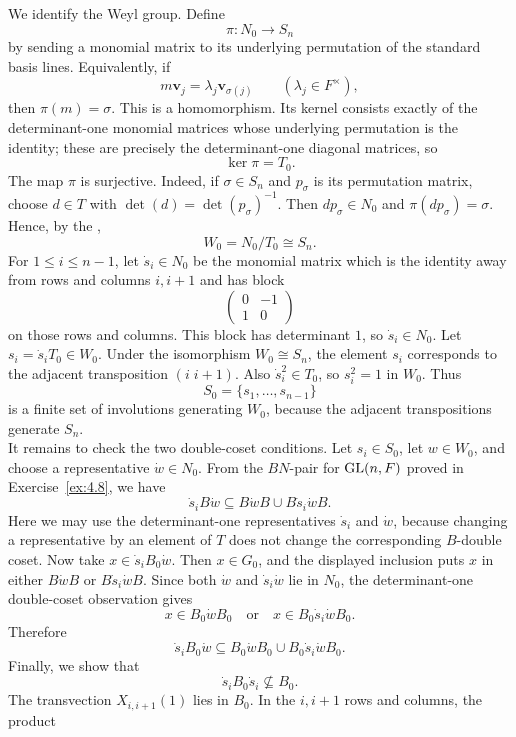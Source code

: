\documentclass[../Odyssey_Project.tex]{subfiles}
\begin{document}
\begin{solution}
We identify the Weyl group. Define
\[
    \pi\colon N_0\to S_n
\]
by sending a monomial matrix to its underlying permutation of the standard basis lines. Equivalently, if
\[
    m\mathbf v_j=\lambda_j\mathbf v_{\sigma(j)}
    \qquad(\lambda_j\in F^\times),
\]
then $\pi(m)=\sigma$. This is a homomorphism. Its kernel consists exactly of the determinant-one monomial matrices whose underlying permutation is the identity; these are precisely the determinant-one diagonal matrices, so
\[
    \ker\pi=T_0.
\]
The map $\pi$ is surjective. Indeed, if $\sigma\in S_n$ and $p_\sigma$ is its permutation matrix, choose $d\in T$ with $\det(d)=\det(p_\sigma)^{-1}$. Then $dp_\sigma\in N_0$ and $\pi(dp_\sigma)=\sigma$. Hence, by the ,
\[
    W_0=N_0/T_0\cong S_n.
\]
For $1\leq i\leq n-1$, let $\dot{s}_i\in N_0$ be the monomial matrix which is the identity away from rows and columns $i,i+1$ and has block
\[
    \begin{pmatrix}
        0&-1\\
        1&0
    \end{pmatrix}
\]
on those rows and columns. This block has determinant $1$, so $\dot{s}_i\in N_0$. Let $s_i=\dot{s}_iT_0\in W_0$. Under the isomorphism $W_0\cong S_n$, the element $s_i$ corresponds to the adjacent transposition $(i\;i+1)$. Also $\dot{s}_i^2\in T_0$, so $s_i^2=1$ in $W_0$. Thus
\[
    S_0=\{s_1,\ldots,s_{n-1}\}
\]
is a finite set of involutions generating $W_0$, because the adjacent transpositions generate $S_n$.\\
It remains to check the two double-coset conditions. Let $s_i\in S_0$, let $w\in W_0$, and choose a representative $\dot{w}\in N_0$. From the $BN$-pair for $\operatorname{GL}(n,F)$ proved in Exercise~\ref{ex:4.8}, we have
\[
    \dot{s}_iB\dot{w}
    \subseteq
    B\dot{w}B\cup B\dot{s}_i\dot{w}B.
\]
Here we may use the determinant-one representatives $\dot{s}_i$ and $\dot{w}$, because changing a representative by an element of $T$ does not change the corresponding $B$-double coset.
Now take $x\in \dot{s}_iB_0\dot{w}$. Then $x\in G_0$, and the displayed inclusion puts $x$ in either $B\dot{w}B$ or $B\dot{s}_i\dot{w}B$. Since both $\dot{w}$ and $\dot{s}_i\dot{w}$ lie in $N_0$, the determinant-one double-coset observation gives
\[
    x\in B_0\dot{w}B_0
    \quad\text{or}\quad
    x\in B_0\dot{s}_i\dot{w}B_0.
\]
Therefore
\[
    \dot{s}_iB_0\dot{w}
    \subseteq
    B_0\dot{w}B_0\cup B_0\dot{s}_i\dot{w}B_0.
\]
Finally, we show that
\[
    \dot{s}_iB_0\dot{s}_i\nsubseteq B_0.
\]
The transvection $X_{i,i+1}(1)$ lies in $B_0$. In the $i,i+1$ rows and columns, the product

\end{solution}
\end{document}

